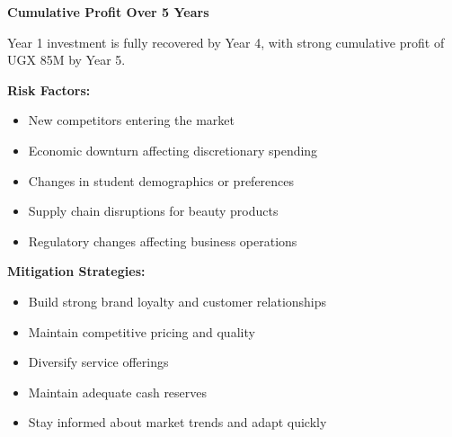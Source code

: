 \documentclass[a4paper,12pt]{article}
\begin{document}
\begin{center}
\textbf{Cumulative Profit Over 5 Years}
\vspace{0.5em}


\vspace{0.5em}
Year 1 investment is fully recovered by Year 4, with strong cumulative profit of UGX 85M by Year 5.
\end{center}

\textbf{Risk Factors:}
\begin{itemize}[leftmargin=2em]
    \item New competitors entering the market
    \item Economic downturn affecting discretionary spending
    \item Changes in student demographics or preferences
    \item Supply chain disruptions for beauty products
    \item Regulatory changes affecting business operations
\end{itemize}

\textbf{Mitigation Strategies:}
\begin{itemize}[leftmargin=2em]
    \item Build strong brand loyalty and customer relationships
    \item Maintain competitive pricing and quality
    \item Diversify service offerings
    \item Maintain adequate cash reserves
    \item Stay informed about market trends and adapt quickly
\end{itemize}
\end{document}
